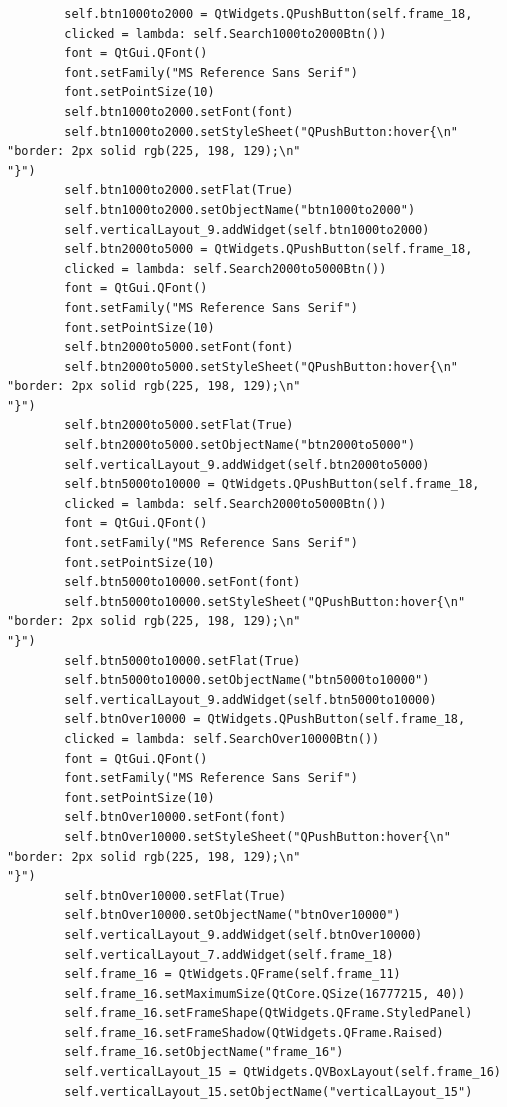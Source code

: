 \documentclass[12pt]{article}
\begin{document}
\begin{verbatim}
        self.btn1000to2000 = QtWidgets.QPushButton(self.frame_18,
        clicked = lambda: self.Search1000to2000Btn())
        font = QtGui.QFont()
        font.setFamily("MS Reference Sans Serif")
        font.setPointSize(10)
        self.btn1000to2000.setFont(font)
        self.btn1000to2000.setStyleSheet("QPushButton:hover{\n"
"border: 2px solid rgb(225, 198, 129);\n"
"}")
        self.btn1000to2000.setFlat(True)
        self.btn1000to2000.setObjectName("btn1000to2000")
        self.verticalLayout_9.addWidget(self.btn1000to2000)
        self.btn2000to5000 = QtWidgets.QPushButton(self.frame_18,
        clicked = lambda: self.Search2000to5000Btn())
        font = QtGui.QFont()
        font.setFamily("MS Reference Sans Serif")
        font.setPointSize(10)
        self.btn2000to5000.setFont(font)
        self.btn2000to5000.setStyleSheet("QPushButton:hover{\n"
"border: 2px solid rgb(225, 198, 129);\n"
"}")
        self.btn2000to5000.setFlat(True)
        self.btn2000to5000.setObjectName("btn2000to5000")
        self.verticalLayout_9.addWidget(self.btn2000to5000)
        self.btn5000to10000 = QtWidgets.QPushButton(self.frame_18,
        clicked = lambda: self.Search2000to5000Btn())
        font = QtGui.QFont()
        font.setFamily("MS Reference Sans Serif")
        font.setPointSize(10)
        self.btn5000to10000.setFont(font)
        self.btn5000to10000.setStyleSheet("QPushButton:hover{\n"
"border: 2px solid rgb(225, 198, 129);\n"
"}")
        self.btn5000to10000.setFlat(True)
        self.btn5000to10000.setObjectName("btn5000to10000")
        self.verticalLayout_9.addWidget(self.btn5000to10000)
        self.btnOver10000 = QtWidgets.QPushButton(self.frame_18, 
        clicked = lambda: self.SearchOver10000Btn())
        font = QtGui.QFont()
        font.setFamily("MS Reference Sans Serif")
        font.setPointSize(10)
        self.btnOver10000.setFont(font)
        self.btnOver10000.setStyleSheet("QPushButton:hover{\n"
"border: 2px solid rgb(225, 198, 129);\n"
"}")
        self.btnOver10000.setFlat(True)
        self.btnOver10000.setObjectName("btnOver10000")
        self.verticalLayout_9.addWidget(self.btnOver10000)
        self.verticalLayout_7.addWidget(self.frame_18)
        self.frame_16 = QtWidgets.QFrame(self.frame_11)
        self.frame_16.setMaximumSize(QtCore.QSize(16777215, 40))
        self.frame_16.setFrameShape(QtWidgets.QFrame.StyledPanel)
        self.frame_16.setFrameShadow(QtWidgets.QFrame.Raised)
        self.frame_16.setObjectName("frame_16")
        self.verticalLayout_15 = QtWidgets.QVBoxLayout(self.frame_16)
        self.verticalLayout_15.setObjectName("verticalLayout_15")

\end{verbatim}
\end{document}
